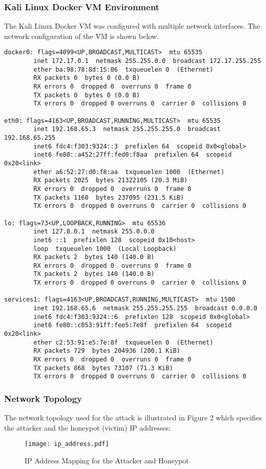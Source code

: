 \documentclass{article}
\begin{document}
\subsubsection*{Kali Linux Docker VM Environment}
The Kali Linux Docker VM was configured with multiple network interfaces. The network configuration of the VM is shown below.
\begin{lstlisting}[language=text, caption={Kali Linux Docker VM ifconfig Output}, label={lst:ifconfig}]
docker0: flags=4099<UP,BROADCAST,MULTICAST>  mtu 65535
        inet 172.17.0.1  netmask 255.255.0.0  broadcast 172.17.255.255
        ether ba:98:78:8d:15:06  txqueuelen 0  (Ethernet)
        RX packets 0  bytes 0 (0.0 B)
        RX errors 0  dropped 0  overruns 0  frame 0
        TX packets 0  bytes 0 (0.0 B)
        TX errors 0  dropped 0 overruns 0  carrier 0  collisions 0

eth0: flags=4163<UP,BROADCAST,RUNNING,MULTICAST>  mtu 65535
        inet 192.168.65.3  netmask 255.255.255.0  broadcast 192.168.65.255
        inet6 fdc4:f303:9324::3  prefixlen 64  scopeid 0x0<global>
        inet6 fe80::a452:27ff:fed0:f8aa  prefixlen 64  scopeid 0x20<link>
        ether a6:52:27:d0:f8:aa  txqueuelen 1000  (Ethernet)
        RX packets 2025  bytes 21322105 (20.3 MiB)
        RX errors 0  dropped 0  overruns 0  frame 0
        TX packets 1160  bytes 237095 (231.5 KiB)
        TX errors 0  dropped 0 overruns 0  carrier 0  collisions 0

lo: flags=73<UP,LOOPBACK,RUNNING>  mtu 65536
        inet 127.0.0.1  netmask 255.0.0.0
        inet6 ::1  prefixlen 128  scopeid 0x10<host>
        loop  txqueuelen 1000  (Local Loopback)
        RX packets 2  bytes 140 (140.0 B)
        RX errors 0  dropped 0  overruns 0  frame 0
        TX packets 2  bytes 140 (140.0 B)
        TX errors 0  dropped 0 overruns 0  carrier 0  collisions 0

services1: flags=4163<UP,BROADCAST,RUNNING,MULTICAST>  mtu 1500
        inet 192.168.65.6  netmask 255.255.255.255  broadcast 0.0.0.0
        inet6 fdc4:f303:9324::6  prefixlen 128  scopeid 0x0<global>
        inet6 fe80::c053:91ff:fee5:7e8f  prefixlen 64  scopeid 0x20<link>
        ether c2:53:91:e5:7e:8f  txqueuelen 0  (Ethernet)
        RX packets 729  bytes 204936 (200.1 KiB)
        RX errors 0  dropped 0  overruns 0  frame 0
        TX packets 868  bytes 73107 (71.3 KiB)
        TX errors 0  dropped 0 overruns 0  carrier 0  collisions 0
\end{lstlisting}
\subsubsection*{Network Topology}
The network topology used for the attack is illustrated in Figure 2 which specifies the attacker and the honeypot (victim) IP addresses:
\begin{figure}[h!]
    \centering
    \texttt{[image: ip\_address.pdf]}  %
    \caption{IP Address Mapping for the Attacker and Honeypot}
    \label{fig:ip_mapping}
\end{figure}
\end{document}
